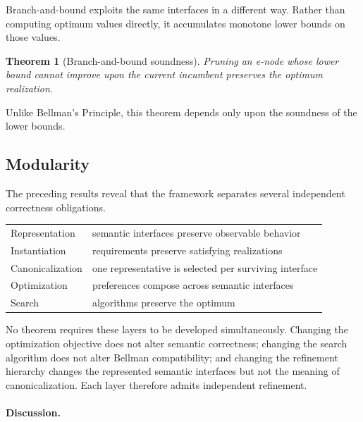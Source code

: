 \documentclass[sigconf,nonacm]{acmart}
\theoremstyle{definition}
\theoremstyle{plain}
\newtheorem{theorem}[definition]{Theorem}
\theoremstyle{remark}
\begin{document}
Branch-and-bound exploits the same interfaces in a different way.
Rather than computing optimum values directly, it accumulates monotone
lower bounds on those values.

\begin{theorem}[Branch-and-bound soundness]
Pruning an e-node whose lower bound cannot improve upon the current
incumbent preserves the optimum realization.
\end{theorem}

Unlike Bellman's Principle, this theorem depends only upon the
soundness of the lower bounds.

\subsection{Modularity}
\label{sec:modularity-theory}

The preceding results reveal that the framework separates several
independent correctness obligations.

\begin{center}
\begin{tabular}{ll}
Representation &
semantic interfaces preserve observable behavior
\\[1ex]

Instantiation &
requirements preserve satisfying realizations
\\[1ex]

Canonicalization &
one representative is selected per surviving interface
\\[1ex]

Optimization &
preferences compose across semantic interfaces
\\[1ex]

Search &
algorithms preserve the optimum
\end{tabular}
\end{center}

No theorem requires these layers to be developed simultaneously.
Changing the optimization objective does not alter semantic
correctness; changing the search algorithm does not alter Bellman
compatibility; and changing the refinement hierarchy changes the
represented semantic interfaces but not the meaning of
canonicalization.  Each layer therefore admits independent refinement.

\paragraph{Discussion.}
\end{document}
